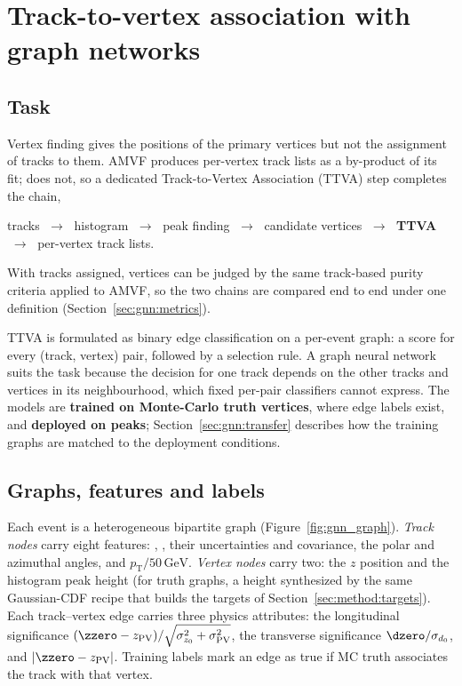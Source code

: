 \section{Track-to-vertex association with graph networks}
\label{sec:gnn}

\subsection{Task}
\label{sec:gnn:task}

Vertex finding gives the positions of the primary vertices but not the
assignment of tracks to them. AMVF produces per-vertex track lists as a
by-product of its fit; \pvf{} does not, so a dedicated Track-to-Vertex
Association (TTVA) step completes the chain,
\begin{center}
tracks $\;\to\;$ \pvf{} histogram $\;\to\;$ peak finding $\;\to\;$
candidate vertices $\;\to\;$ \textbf{TTVA} $\;\to\;$ per-vertex track lists.
\end{center}
With tracks assigned, \pvf{} vertices can be judged by the same track-based
purity criteria applied to AMVF, so the two chains are compared end to end
under one definition (Section~\ref{sec:gnn:metrics}).

TTVA is formulated as binary edge classification on a per-event graph: a
score for every (track, vertex) pair, followed by a selection rule. A graph
neural network suits the task because the decision for one track depends on
the other tracks and vertices in its neighbourhood, which fixed per-pair
classifiers cannot express. The models are \textbf{trained on Monte-Carlo
truth vertices}, where edge labels exist, and \textbf{deployed on \pvf{}
peaks}; Section~\ref{sec:gnn:transfer} describes how the training graphs are
matched to the deployment conditions.

\subsection{Graphs, features and labels}
\label{sec:gnn:graphs}

Each event is a heterogeneous bipartite graph (Figure~\ref{fig:gnn_graph}).
\emph{Track nodes} carry eight features: \dzero{}, \zzero{}, their
uncertainties and covariance, the polar and azimuthal angles, and
$p_{\mathrm{T}}/50\,\mathrm{GeV}$. \emph{Vertex nodes} carry two: the $z$
position and the histogram peak height (for truth graphs, a height synthesized
by the same Gaussian-CDF recipe that builds the \pvf{} targets of
Section~\ref{sec:method:targets}). Each track--vertex edge carries three
physics attributes: the longitudinal significance
$(\zzero-z_{\mathrm{PV}})/\sqrt{\sigma_{z_0}^{2}+\sigma_{\mathrm{PV}}^{2}}$, the
transverse significance $\dzero/\sigma_{d_0}$, and $|\zzero-z_{\mathrm{PV}}|$.
Training labels mark an edge as true if MC truth associates the track with
that vertex.


